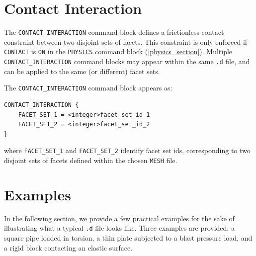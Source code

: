 \documentclass[11pt]{article} %
\begin{document}
\section{Contact Interaction} The \texttt{CONTACT\_INTERACTION} command block defines a frictionless contact constraint between two disjoint sets of facets. This constraint is only enforced if \texttt{CONTACT} is \texttt{ON} in the \texttt{PHYSICS} command block (\ref{physics_section}). Multiple \texttt{CONTACT\_INTERACTION} command blocks may appear within the same \texttt{.d} file, and can be applied to the same (or different) facet sets.

The \texttt{CONTACT\_INTERACTION} command block appears as:
\begin{lstlisting}
CONTACT_INTERACTION {
	FACET_SET_1 = <integer>facet_set_id_1
	FACET_SET_2 = <integer>facet_set_id_2
}
\end{lstlisting}
where \texttt{FACET\_SET\_1} and \texttt{FACET\_SET\_2} identify facet set ids, corresponding to two disjoint sets of facets defined within the chosen \texttt{MESH} file.

\newpage
\section{Examples} In the following section, we provide a few practical examples for the sake of illustrating what a typical \texttt{.d} file looks like. Three examples are provided: a square pipe loaded in torsion, a thin plate subjected to a blast pressure load, and a rigid block contacting an elastic surface.
\end{document}
